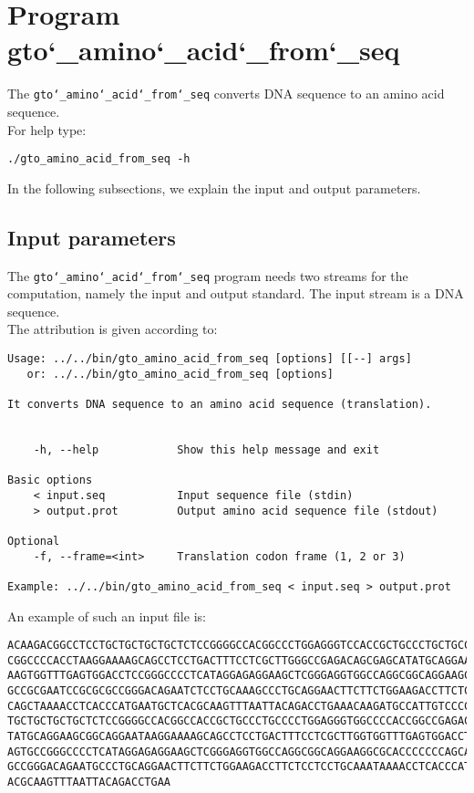 \section{Program gto\char`_amino\char`_acid\char`_from\char`_seq}
The \texttt{gto\char`_amino\char`_acid\char`_from\char`_seq} converts DNA sequence to an amino acid sequence.\\
For help type:
\begin{lstlisting}
./gto_amino_acid_from_seq -h
\end{lstlisting}
In the following subsections, we explain the input and output parameters.

\subsection*{Input parameters}

The \texttt{gto\char`_amino\char`_acid\char`_from\char`_seq} program needs two streams for the computation, namely the input and output standard. The input stream is a DNA sequence.\\
The attribution is given according to:
\begin{lstlisting}
Usage: ../../bin/gto_amino_acid_from_seq [options] [[--] args]
   or: ../../bin/gto_amino_acid_from_seq [options]

It converts DNA sequence to an amino acid sequence (translation).


    -h, --help            Show this help message and exit

Basic options
    < input.seq           Input sequence file (stdin)
    > output.prot         Output amino acid sequence file (stdout)

Optional
    -f, --frame=<int>     Translation codon frame (1, 2 or 3)

Example: ../../bin/gto_amino_acid_from_seq < input.seq > output.prot
\end{lstlisting}
An example of such an input file is:
\begin{lstlisting}
ACAAGACGGCCTCCTGCTGCTGCTGCTCTCCGGGGCCACGGCCCTGGAGGGTCCACCGCTGCCCTGCTGCCATTGTCCC
CGGCCCCACCTAAGGAAAAGCAGCCTCCTGACTTTCCTCGCTTGGGCCGAGACAGCGAGCATATGCAGGAAGCGGCAGG
AAGTGGTTTGAGTGGACCTCCGGGCCCCTCATAGGAGAGGAAGCTCGGGAGGTGGCCAGGCGGCAGGAAGCAGGCCAGT
GCCGCGAATCCGCGCGCCGGGACAGAATCTCCTGCAAAGCCCTGCAGGAACTTCTTCTGGAAGACCTTCTCCACCCCCC
CAGCTAAAACCTCACCCATGAATGCTCACGCAAGTTTAATTACAGACCTGAAACAAGATGCCATTGTCCCCCGGCCTCC
TGCTGCTGCTGCTCTCCGGGGCCACGGCCACCGCTGCCCTGCCCCTGGAGGGTGGCCCCACCGGCCGAGACAGCGAGCA
TATGCAGGAAGCGGCAGGAATAAGGAAAAGCAGCCTCCTGACTTTCCTCGCTTGGTGGTTTGAGTGGACCTCCCAGGCC
AGTGCCGGGCCCCTCATAGGAGAGGAAGCTCGGGAGGTGGCCAGGCGGCAGGAAGGCGCACCCCCCCAGCAATCCGCGC
GCCGGGACAGAATGCCCTGCAGGAACTTCTTCTGGAAGACCTTCTCCTCCTGCAAATAAAACCTCACCCATGAATGCTC
ACGCAAGTTTAATTACAGACCTGAA
\end{lstlisting}

